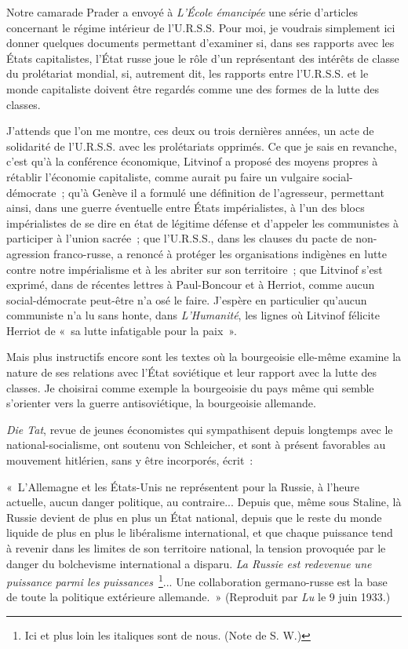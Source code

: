 \documentclass[french,twoside]{book} %
\begin{document}
Notre camarade Prader a envoyé à {\itshape L'École émancipée} une série d'articles concernant le régime intérieur de l'U.R.S.S. Pour moi, je voudrais simplement ici donner quelques documents permettant d'examiner si, dans ses rapports avec les États capitalistes, l'État russe joue le rôle d'un représentant des inté­rêts de classe du prolétariat mondial, si, autrement dit, les rapports entre l'U.R.S.S. et le monde capitaliste doivent être regardés comme une des formes de la lutte des classes.\par
J'attends que l'on me montre, ces deux ou trois dernières années, un acte de solidarité de l'U.R.S.S. avec les prolétariats opprimés. Ce que je sais en revanche, c'est qu'à la conférence économique, Litvinof a proposé des moyens propres à rétablir l'économie capitaliste, comme aurait pu faire un vulgaire social-démocrate ; qu'à Genève il a formulé une définition de l'agresseur, per­mettant ainsi, dans une guerre éventuelle entre États impérialistes, à l'un des blocs impérialistes de se dire en état de légitime défense et d'appeler les communistes à participer à l'union sacrée ; que l'U.R.S.S., dans les clauses du pacte de non-agression franco-russe, a renoncé à protéger les organisations indigènes en lutte contre notre impérialisme et à les abriter sur son territoire ; que Litvinof s'est exprimé, dans de récentes lettres à Paul-Boncour et à Herriot, comme aucun social-démocrate peut-être n'a osé le faire. J'espère en particulier qu'aucun communiste n'a lu sans honte, dans {\itshape L'Humanité}, les lignes où Litvinof félicite Herriot de « sa lutte infatigable pour la paix ».\par
Mais plus instructifs encore sont les textes où la bourgeoisie elle-même examine la nature de ses relations avec l'État soviétique et leur rapport avec la lutte des classes. Je choisirai comme exemple la bourgeoisie du pays même qui semble s'orienter vers la guerre antisoviétique, la bourgeoisie allemande.\par
{\itshape Die Tat}, revue de jeunes économistes qui sympathisent depuis longtemps avec le national-socialisme, ont soutenu von Schleicher, et sont à présent favorables au mouvement hitlérien, sans y être incorporés, écrit :\par
« L'Allemagne et les États-Unis ne représentent pour la Russie, à l'heure actuelle, aucun danger politique, au contraire... Depuis que, même sous Staline, là Russie devient de plus en plus un État national, depuis que le reste du monde liquide de plus en plus le libéralisme international, et que chaque puissance tend à revenir dans les limites de son territoire national, la tension provoquée par le danger du bolchevisme international a disparu. {\itshape La Russie est redevenue une puissance parmi les puissances} \footnote{Ici et plus loin les italiques sont de nous. (Note de S. W.)}... Une collaboration germano-russe est la base de toute la politique extérieure allemande. » (Reproduit par {\itshape Lu} le 9 juin 1933.)\par
\end{document}
